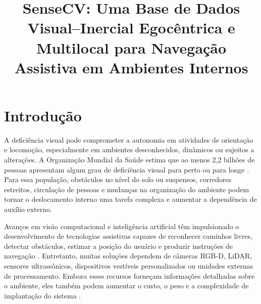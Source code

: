 \documentclass[conference]{IEEEtran}
\begin{document}
\title{SenseCV: Uma Base de Dados Visual--Inercial Egocêntrica e Multilocal para Navegação Assistiva em Ambientes Internos}

\author{   }

\maketitle

\begin{abstract}

\end{abstract}

\begin{IEEEkeywords}

\end{IEEEkeywords}

\section{Introdução}

A deficiência visual pode comprometer a autonomia em atividades de orientação e locomoção, especialmente em ambientes desconhecidos, dinâmicos ou sujeitos a alterações. A Organização Mundial da Saúde estima que ao menos 2,2 bilhões de pessoas apresentam algum grau de deficiência visual para perto ou para longe \cite{who2026}. Para essa população, obstáculos no nível do solo ou suspensos, corredores estreitos, circulação de pessoas e mudanças na organização do ambiente podem tornar o deslocamento interno uma tarefa complexa e aumentar a dependência de auxílio externo.

Avanços em visão computacional e inteligência artificial têm impulsionado o desenvolvimento de tecnologias assistivas capazes de reconhecer caminhos livres, detectar obstáculos, estimar a posição do usuário e produzir instruções de navegação \cite{casanova2025, khan2022}. Entretanto, muitas soluções dependem de câmeras RGB-D, LiDAR, sensores ultrassônicos, dispositivos vestíveis personalizados ou unidades externas de processamento. Embora esses recursos forneçam informações detalhadas sobre o ambiente, eles também podem aumentar o custo, o peso e a complexidade de implantação do sistema \cite{gao2025}.
\end{document}
